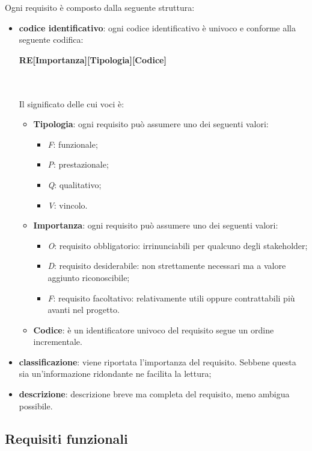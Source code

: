 Ogni requisito è composto dalla seguente struttura:
\begin{itemize}
	\item \textbf{codice identificativo}: ogni codice identificativo è univoco e conforme alla seguente codifica:\\
	\centerline{\textbf{RE[Importanza][Tipologia][Codice]}} \\ \\
	Il significato delle cui voci è:
	\begin{itemize}
		\item \textbf{Tipologia}: ogni requisito può assumere uno dei seguenti valori:
		\begin{itemize}
			\item \textit{F}: funzionale;
			\item \textit{P}: prestazionale;
			\item \textit{Q}: qualitativo;
			\item \textit{V}: vincolo.
		\end{itemize}
		\item \textbf{Importanza}: ogni requisito può assumere uno dei seguenti valori:
		\begin{itemize}
			\item \textit{O}: requisito obbligatorio: irrinunciabili per qualcuno degli stakeholder;
			\item \textit{D}: requisito desiderabile: non strettamente necessari ma  a valore aggiunto riconoscibile;
			\item \textit{F}: requisito facoltativo: relativamente utili oppure contrattabili più avanti nel progetto.	
		\end{itemize}
		\item \textbf{Codice}: è un identificatore univoco del requisito segue un ordine incrementale.
	\end{itemize}
	\item \textbf{classificazione}: viene riportata l'importanza del requisito. Sebbene questa sia un'informazione ridondante ne facilita la lettura;
	\item \textbf{descrizione}: descrizione breve ma completa del requisito, meno ambigua possibile.
\end{itemize}
\renewcommand{\arraystretch}{1.5}



\subsection{Requisiti funzionali}

